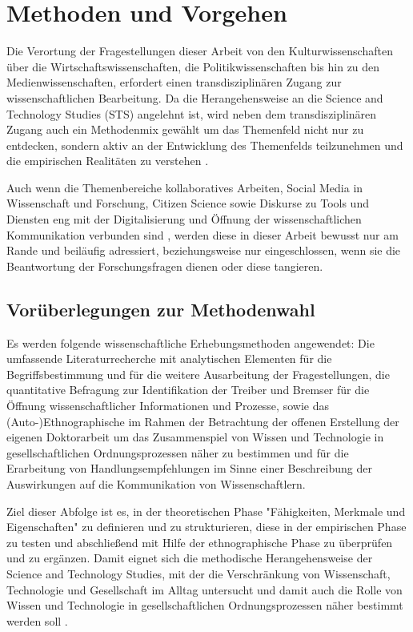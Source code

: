 \chapter{Methoden und Vorgehen}

Die Verortung der Fragestellungen dieser Arbeit von den Kulturwissenschaften über die Wirtschaftswissenschaften, die Politikwissenschaften bis hin zu den Medienwissenschaften, erfordert einen transdisziplinären Zugang zur wissenschaftlichen Bearbeitung. Da die Herangehensweise an die Science and Technology Studies (STS) angelehnt ist, wird neben dem transdisziplinären Zugang auch ein Methodenmix gewählt um das Themenfeld nicht nur zu entdecken, sondern aktiv an der Entwicklung des Themenfelds teilzunehmen \cite{MacKenzie_STS_1999} und die empirischen Realitäten zu verstehen \cite{kelty_2014_freedom}.

Auch wenn die Themenbereiche kollaboratives Arbeiten, Social Media in Wissenschaft und Forschung, Citizen Science sowie Diskurse zu Tools und Diensten eng mit der Digitalisierung und Öffnung der wissenschaftlichen Kommunikation verbunden sind \cite{eu_agenda_open_science_2015}, werden diese in dieser Arbeit bewusst nur am Rande und beiläufig adressiert, beziehungsweise nur eingeschlossen, wenn sie die Beantwortung der Forschungsfragen dienen oder diese tangieren.

\section{Vorüberlegungen zur Methodenwahl}

Es werden folgende wissenschaftliche Erhebungsmethoden angewendet: Die umfassende Literaturrecherche mit analytischen Elementen für die Begriffsbestimmung und für die weitere Ausarbeitung der Fragestellungen, die quantitative Befragung zur Identifikation der Treiber und Bremser für die Öffnung wissenschaftlicher Informationen und Prozesse, sowie das (Auto-)Ethnographische im Rahmen der Betrachtung der offenen Erstellung der eigenen Doktorarbeit um das Zusammenspiel von Wissen und Technologie in gesellschaftlichen Ordnungsprozessen näher zu bestimmen und für die Erarbeitung von Handlungsempfehlungen im Sinne einer Beschreibung der Auswirkungen auf die Kommunikation von Wissenschaftlern.

Ziel dieser Abfolge ist es, in der theoretischen Phase "Fähigkeiten, Merkmale und Eigenschaften" \cite{raab_2012_fragebogen} zu definieren und zu strukturieren, diese in der empirischen Phase zu testen und abschließend mit Hilfe der ethnographische Phase zu überprüfen und zu ergänzen. Damit eignet sich die methodische Herangehensweise der Science and Technology Studies, mit der die Verschränkung von Wissenschaft, Technologie und Gesellschaft im Alltag untersucht und damit auch die Rolle von Wissen und Technologie in gesellschaftlichen Ordnungsprozessen näher bestimmt werden soll \cite{beck_2014_science}.


